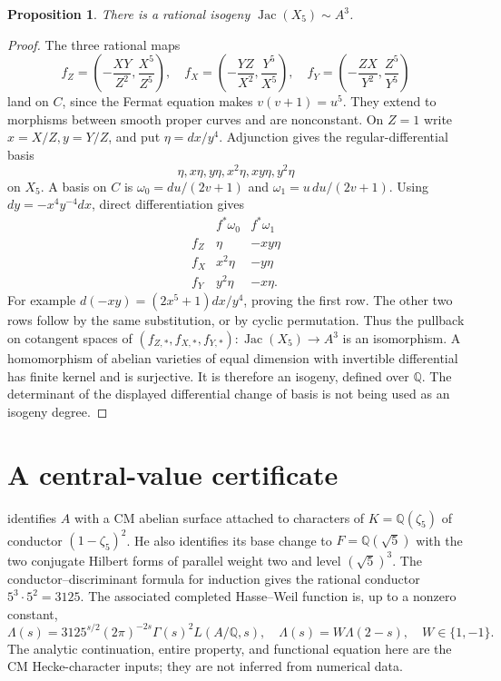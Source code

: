 \documentclass[11pt]{article}
\newcommand{\Q}{\mathbb Q}
\numberwithin{equation}{section}
\newcommand{\Jac}{\operatorname{Jac}}
\newtheorem{proposition}[theorem]{Proposition}
\theoremstyle{definition}
\begin{document}
\begin{proposition}\label{prop:isogeny}
There is a rational isogeny $\Jac(X_5)\sim A^3$.
\end{proposition}
\begin{proof}
The three rational maps
\begin{equation}
f_Z=\left(-\frac{XY}{Z^2},\frac{X^5}{Z^5}\right),\quad
f_X=\left(-\frac{YZ}{X^2},\frac{Y^5}{X^5}\right),\quad
f_Y=\left(-\frac{ZX}{Y^2},\frac{Z^5}{Y^5}\right)
\label{eq:maps}
\end{equation}
land on $C$, since the Fermat equation makes $v(v+1)=u^5$.
They extend to morphisms between smooth proper curves and are
nonconstant. On $Z=1$ write $x=X/Z,y=Y/Z$, and put
$\eta=dx/y^4$. Adjunction gives the regular-differential basis
\[
\eta, x\eta, y\eta, x^2\eta, xy\eta, y^2\eta
\]
on $X_5$. A basis on $C$ is
$\omega_0=du/(2v+1)$ and $\omega_1=u\,du/(2v+1)$.
Using $dy=-x^4y^{-4}dx$, direct differentiation gives
\begin{equation}
\begin{array}{c|cc}
 &f^*\omega_0&f^*\omega_1\\\hline
f_Z&\eta&-xy\eta\\
f_X&x^2\eta&-y\eta\\
f_Y&y^2\eta&-x\eta.
\end{array}
\label{eq:differentials}
\end{equation}
For example $d(-xy)=(2x^5+1)dx/y^4$, proving the first row.
The other two rows follow by the same substitution, or by cyclic
permutation. Thus the pullback on cotangent spaces of
$(f_{Z,*},f_{X,*},f_{Y,*}):\Jac(X_5)\to A^3$ is an isomorphism.
A homomorphism of abelian varieties of equal dimension with invertible
differential has finite kernel and is surjective. It is therefore an
isogeny, defined over $\Q$. The determinant of the displayed
differential change of basis is not being used as an isogeny degree.
\end{proof}



\section{A central-value certificate}

\citet[p.~439, following Table 3]{Darmon2000} identifies $A$ with a CM
abelian surface attached to characters of $K=\Q(\zeta_5)$ of conductor
$(1-\zeta_5)^2$. He also identifies its base change to
$F=\Q(\sqrt5)$ with the two conjugate Hilbert forms of parallel weight
two and level $(\sqrt5)^3$. The conductor--discriminant formula for
induction gives the rational conductor $5^3\cdot5^2=3125$.
The associated completed Hasse--Weil function is, up to a nonzero
constant,
\begin{equation}
\Lambda(s)=3125^{s/2}(2\pi)^{-2s}\Gamma(s)^2 L(A/\Q,s),
\quad \Lambda(s)=W\Lambda(2-s),\quad W\in\{1,-1\}.
\label{eq:fe}
\end{equation}
The analytic continuation, entire property, and functional equation
here are the CM Hecke-character inputs; they are not inferred from
numerical data.
\end{document}
